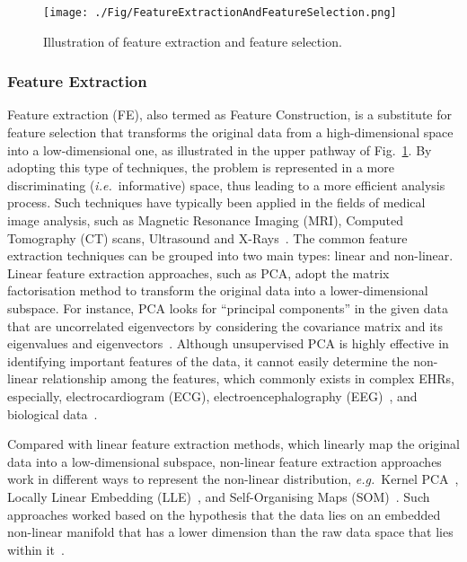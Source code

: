 \documentclass{article}
\newcommand{\zzie}{\emph{i.e.}~}
\newcommand{\zzeg}{\emph{e.g.}~}
\newcommand*{\1}{\textcolor{magenta}}
\begin{document}
	\begin{figure}[!htbp]
	\centering
	\texttt{[image: ./Fig/FeatureExtractionAndFeatureSelection.png]}
	\caption{Illustration of feature extraction and feature selection.}\label{fig:fe-fs}
\end{figure}
	
	
	\subsubsection{Feature Extraction}\label{sec:fe}
	Feature extraction (FE), also termed as Feature Construction, is a substitute for feature selection that transforms the original data from a high-dimensional space into a low-dimensional one, as illustrated in the upper pathway of Fig.~\ref{fig:fe-fs}. By adopting this type of techniques, the problem is represented in a more discriminating (\zzie informative) space, thus leading to a more efficient analysis process. Such techniques have typically been applied in the fields of medical image analysis, such as Magnetic Resonance Imaging (MRI), Computed Tomography (CT) scans, Ultrasound and X-Rays~\cite{remeseiro2019review}. The common feature extraction techniques can be grouped into two main types: linear and non-linear. Linear feature extraction approaches, such as PCA, adopt the matrix factorisation method to transform the original data into a lower-dimensional subspace. For instance, PCA looks for ``principal components'' in the given data that are uncorrelated eigenvectors by considering the covariance matrix and its eigenvalues and eigenvectors~\cite{zuo2018gaze}. Although unsupervised PCA is highly effective in identifying important features of the data, it cannot easily determine the non-linear relationship among the features, which commonly exists in complex EHRs, especially, electrocardiogram (ECG), electroencephalography (EEG)~\cite{al2017enhanced}, and biological data~\cite{remeseiro2019review}. 
	
	Compared with linear feature extraction methods, which linearly map the original data into a low-dimensional subspace, non-linear feature extraction approaches work in different ways to represent the non-linear distribution, \zzeg Kernel PCA~\cite{aziz2017dimension}, Locally Linear Embedding (LLE)~\cite{aziz2017dimension}, and Self-Organising Maps (SOM)~\cite{li2019machine}. Such approaches worked based on the hypothesis that the data lies on an embedded non-linear manifold that has a lower dimension than the raw data space that lies within it~\cite{aziz2017dimension}. 
	
\end{document}
